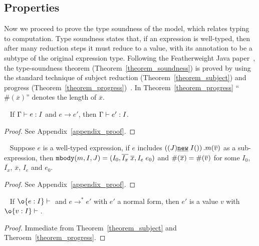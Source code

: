 \begin{comment}
\begin{figure*}[t]
\begin{mathpar}
\end{mathpar}
\caption{Congruence.}\label{fig:congruence}
\end{figure*}
\end{comment}


\subsection{Properties}
Now we proceed to prove the type soundness of 
the model, which relates typing to computation. Type soundness states that, if an expression is 
well-typed, then after many reduction steps it must reduce to a value, with its annotation to be a subtype of the original expression type.
Following the Featherweight Java paper~\cite{Igarashi01FJ}, the type-soundness theorem 
(Theorem~\ref{theorem_soundness}) is proved by using the standard technique of subject reduction (Theorem~\ref{theorem_subject})
and progress (Theorem~\ref{theorem_progress})~\cite{Wright1994}. In Theorem~\ref{theorem_progress} ``$\#(\overline{x})$'' denotes the length of
$\overline{x}$.

\begin{theorem}~\label{theorem_subject}
If $\Gamma \; {\vdash} \; e : I$ and $e \rightarrow e'$, 
then $\Gamma \; {\vdash} \; e' : I$.
\end{theorem}
\begin{proof}
See Appendix~\ref{appendix_proof}.
\end{proof}

\begin{theorem}[Progress]~\label{theorem_progress}
Suppose $e$ is a well-typed expression, if $e$ includes 
$\left((J)\emph{\texttt{new}}\;I()\right).m(\overline{v})$ as a sub-expression, then $\texttt{mbody}(m, I, J) = (I_0, \overline{I_x} \; \overline{x}, I_e\; e_0)$ and $\#(\overline{x}) = \#(\overline{v})$ for some $I_0$, $\overline{I_x}$, $\overline{x}$, $I_e$ and $e_0$.
\end{theorem}
\begin{proof}
See Appendix~\ref{appendix_proof}.
\end{proof}

\begin{theorem}~\label{theorem_soundness}
If $\judgeewf \o {e : I}$ and $e \to^* e'$ with $e'$ a normal form, then $e'$ is 
a value $v$ with $\judgeewf \o {v:I}$.
\end{theorem}
\begin{proof}
Immediate from Theorem~\ref{theorem_subject} and Theroem~\ref{theorem_progress}.
\end{proof}
